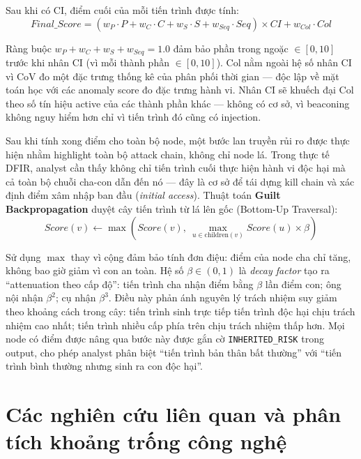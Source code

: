 \documentclass[../main.tex]{subfiles}
\begin{document}
Sau khi có CI, điểm cuối của mỗi tiến trình được tính:
\begin{equation}
    Final\_Score = \left(w_P \cdot P + w_C \cdot C + w_S \cdot S + w_{Seq} \cdot Seq\right) \times CI + w_{Col} \cdot Col \tag{1.26}
\end{equation}

Ràng buộc $w_P + w_C + w_S + w_{Seq} = 1.0$ đảm bảo phần trong ngoặc $\in [0, 10]$ trước khi nhân CI (vì mỗi thành phần $\in [0, 10]$). Col nằm ngoài hệ số nhân CI vì CoV đo một đặc trưng thống kê của phân phối thời gian — độc lập về mặt toán học với các anomaly score đo đặc trưng hành vi. Nhân CI sẽ khuếch đại Col theo số tín hiệu active của các thành phần khác — không có cơ sở, vì beaconing không nguy hiểm hơn chỉ vì tiến trình đó cũng có injection.

Sau khi tính xong điểm cho toàn bộ node, một bước lan truyền rủi ro được thực hiện nhằm highlight toàn bộ attack chain, không chỉ node lá. Trong thực tế DFIR, analyst cần thấy không chỉ tiến trình cuối thực hiện hành vi độc hại mà cả toàn bộ chuỗi cha-con dẫn đến nó — đây là cơ sở để tái dựng kill chain và xác định điểm xâm nhập ban đầu (\textit{initial access}). Thuật toán \textbf{Guilt Backpropagation} duyệt cây tiến trình từ lá lên gốc (Bottom-Up Traversal):
\begin{equation}
    Score(v) \leftarrow \max\!\left(Score(v),\ \max_{u \in \text{children}(v)} Score(u) \times \beta\right) \tag{1.27}
\end{equation}

Sử dụng $\max$ thay vì cộng đảm bảo tính đơn điệu: điểm của node cha chỉ tăng, không bao giờ giảm vì con an toàn. Hệ số $\beta \in (0, 1)$ là \textit{decay factor} tạo ra ``attenuation theo cấp độ'': tiến trình cha nhận điểm bằng $\beta$ lần điểm con; ông nội nhận $\beta^2$; cụ nhận $\beta^3$. Điều này phản ánh nguyên lý trách nhiệm suy giảm theo khoảng cách trong cây: tiến trình sinh trực tiếp tiến trình độc hại chịu trách nhiệm cao nhất; tiến trình nhiều cấp phía trên chịu trách nhiệm thấp hơn. Mọi node có điểm được nâng qua bước này được gắn cờ \texttt{INHERITED\_RISK} trong output, cho phép analyst phân biệt ``tiến trình bản thân bất thường'' với ``tiến trình bình thường nhưng sinh ra con độc hại''.

\section{Các nghiên cứu liên quan và phân tích khoảng trống công nghệ}
\label{section:Related_works_and_gap}
\end{document}
